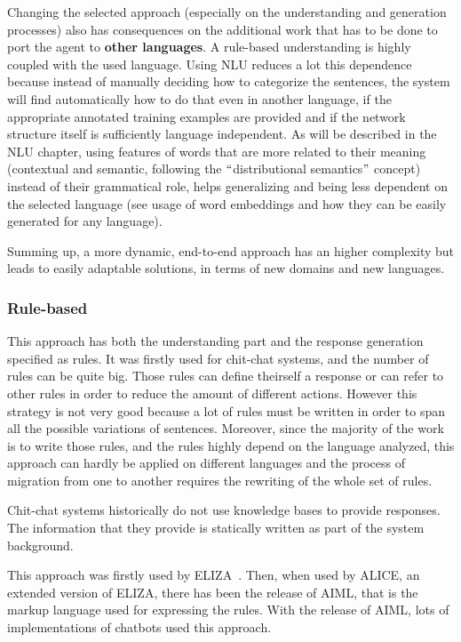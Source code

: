 Changing the selected approach (especially on the understanding and generation processes) also has consequences on the additional work that has to be done to port the agent to \textbf{other languages}. A rule-based understanding is highly coupled with the used language. Using NLU reduces a lot this dependence because instead of manually deciding how to categorize the sentences, the system will find automatically how to do that even in another language, if the appropriate annotated training examples are provided and if the network structure itself is sufficiently language independent. As will be described in the NLU chapter, using features of words that are more related to their meaning (contextual and semantic, following the $``$distributional semantics$"$  concept) instead of their grammatical role, helps generalizing and being less dependent on the selected language (see usage of word embeddings and how they can be easily generated for any language).

Summing up, a more dynamic, end-to-end approach has an higher complexity but leads to easily adaptable solutions, in terms of new domains and new languages.

\subsubsection{Rule-based}
\label{soaRuleApproach}

This approach has both the understanding part and the response generation specified as rules. It was firstly used for chit-chat systems, and the number of rules can be quite big. Those rules can define theirself a response or can refer to other rules in order to reduce the amount of different actions. However this strategy is not very good because a lot of rules must be written in order to span all the possible variations of sentences. Moreover, since the majority of the work is to write those rules, and the rules highly depend on the language analyzed, this approach can hardly be applied on different languages and the process of migration from one to another requires the rewriting of the whole set of rules.

Chit-chat systems historically do not use knowledge bases to provide responses. The information that they provide is statically written as part of the  system background.

This approach was firstly used by ELIZA~\cite{weizenbaum1966eliza}. Then, when used by ALICE, an extended version of ELIZA, there has been the release of AIML, that is the markup language used for expressing the rules. With the release of AIML, lots of implementations of chatbots used this approach.

